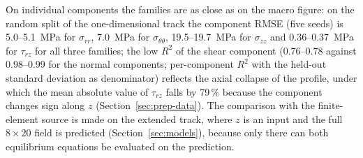 \documentclass[subscriptcorrection,upint,varvw,barcolor=Goldenrod3,mathalfa=cal=euler,balance,hyphenate,french,pdf-a]{asmejour} %
\begin{document}
On individual components the families are as close as on the macro figure: on the random split of the one-dimensional track the component RMSE (five seeds) is 5.0--5.1~MPa for $\sigma_{rr}$, 7.0~MPa for $\sigma_{\theta\theta}$, 19.5--19.7~MPa for $\sigma_{zz}$ and 0.36--0.37~MPa for $\tau_{rz}$ for all three families; the low $R^2$ of the shear component (0.76--0.78 against 0.98--0.99 for the normal components; per-component $R^2$ with the held-out standard deviation as denominator) reflects %
the axial collapse of the profile, under which the mean absolute value of $\tau_{rz}$ falls by 79\,\% because the component changes sign along $z$ (Section~\ref{sec:prep-data}). The comparison with the finite-element source is made on the extended track, where $z$ is an input and the full $8\times20$ field is predicted (Section~\ref{sec:models}), because only there can both equilibrium equations be evaluated on the prediction.
\end{document}
